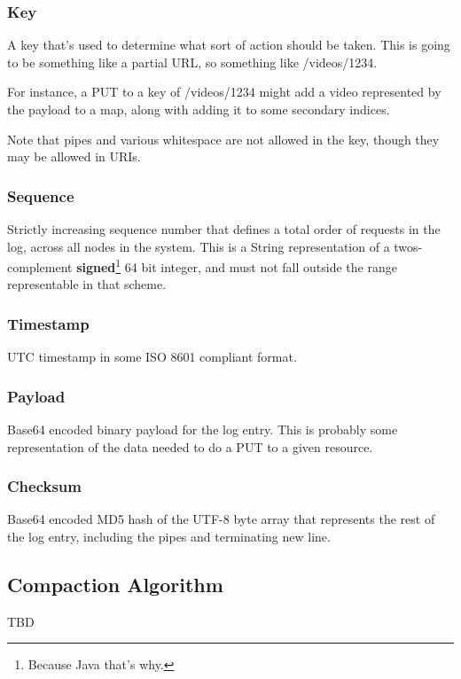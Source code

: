 \subsubsection{Key}
A key that’s used to determine what sort of action should be taken.  This is going to be something like a partial URL, so something like /videos/1234.

For instance, a PUT to a key of /videos/1234 might add a video represented by the payload to a map, along with adding it to some secondary indices.  

Note that pipes and various whitespace are not allowed in the key, though they may be allowed in URIs.

\subsubsection{Sequence}
Strictly increasing sequence number that defines a total order of requests in the log, across all nodes in the system.  This is a String representation of a twos-complement \textbf{signed}\footnote{Because Java that’s why.} 64 bit integer, and must not fall outside the range representable in that scheme.

\subsubsection{Timestamp}
UTC timestamp in some ISO 8601 compliant format.

\subsubsection{Payload}
Base64 encoded binary payload for the log entry.  This is probably some representation of the data needed to do a PUT to a given resource.

\subsubsection{Checksum}
Base64 encoded MD5 hash of the UTF-8 byte array that represents the rest of the log entry, including the pipes and terminating new line.

\subsection{Compaction Algorithm}
TBD




